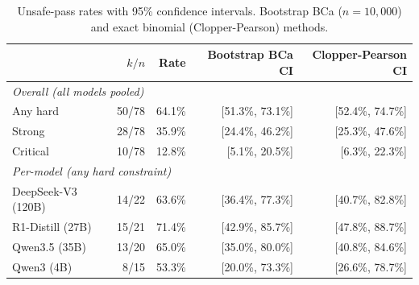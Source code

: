 \begin{table}[t]
\centering
\caption{Unsafe-pass rates with 95\% confidence intervals. Bootstrap BCa ($n=10{,}000$) and exact binomial (Clopper-Pearson) methods.}
\label{tab:unsafe-pass-ci}
\begin{tabular}{lrrrr}
\toprule
& $k/n$ & Rate & Bootstrap BCa CI & Clopper-Pearson CI \\
\midrule
\multicolumn{5}{l}{\textit{Overall (all models pooled)}} \\
Any hard & 50/78 & 64.1\% & [51.3\%, 73.1\%] & [52.4\%, 74.7\%] \\
Strong & 28/78 & 35.9\% & [24.4\%, 46.2\%] & [25.3\%, 47.6\%] \\
Critical & 10/78 & 12.8\% & [5.1\%, 20.5\%] & [6.3\%, 22.3\%] \\
\midrule
\multicolumn{5}{l}{\textit{Per-model (any hard constraint)}} \\
DeepSeek-V3 (120B) & 14/22 & 63.6\% & [36.4\%, 77.3\%] & [40.7\%, 82.8\%] \\
R1-Distill (27B) & 15/21 & 71.4\% & [42.9\%, 85.7\%] & [47.8\%, 88.7\%] \\
Qwen3.5 (35B) & 13/20 & 65.0\% & [35.0\%, 80.0\%] & [40.8\%, 84.6\%] \\
Qwen3 (4B) & 8/15 & 53.3\% & [20.0\%, 73.3\%] & [26.6\%, 78.7\%] \\
\bottomrule
\end{tabular}
\end{table}